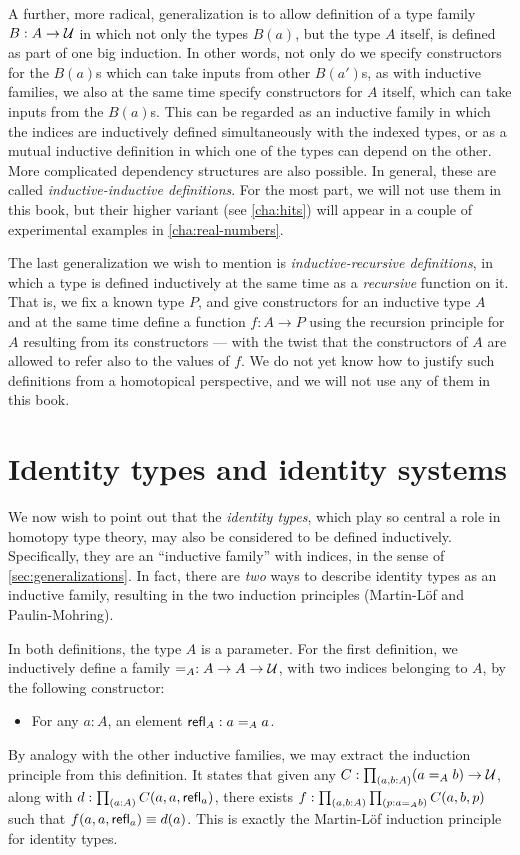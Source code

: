 A further, more radical, generalization is to allow definition of a type family $B:A\to \mathcal{U}$ in which not only the types $B(a)$, but the type $A$ itself, is defined as part of one big induction.
In other words, not only do we specify constructors for the $B(a)$s which can take inputs from other $B(a')$s, as with inductive families, we also at the same time specify constructors for $A$ itself, which can take inputs from the $B(a)$s.
This can be regarded as an inductive family in which the indices are inductively defined simultaneously with the indexed types, or as a mutual inductive definition in which one of the types can depend on the other.
More complicated dependency structures are also possible.
In general, these are called \emph{inductive-inductive definitions}.
For the most part, we will not use them in this book, but their higher variant (see \autoref{cha:hits}) will appear in a couple of experimental examples in \autoref{cha:real-numbers}.

The last generalization we wish to mention is \emph{inductive-recursive definitions}, in which a type is defined inductively at the same time as a \emph{recursive} function on it.
That is, we fix a known type $P$, and give constructors for an inductive type $A$ and at the same time define a function $f:A\to P$ using the recursion principle for $A$ resulting from its constructors --- with the twist that the constructors of $A$ are allowed to refer also to the values of $f$.
We do not yet know how to justify such definitions from a homotopical perspective, and we will not use any of them in this book.


\section{Identity types and identity systems}
\label{sec:identity-systems}

We now wish to point out that the \emph{identity types}, which play so central a role in homotopy type theory, may also be considered to be defined inductively.
Specifically, they are an ``inductive family'' with indices, in the sense of \autoref{sec:generalizations}.
In fact, there are \emph{two} ways to describe identity types as an inductive family, resulting in the two induction principles (Martin-L\"of and Paulin-Mohring).

In both definitions, the type $A$ is a parameter.
For the first definition, we inductively define a family $=_A : A\to A\to \mathcal{U}$, with two indices belonging to $A$, by the following constructor:
\begin{itemize}
\item For any $a:A$, an element $\mathsf{refl}_{A} : a=_A a$.
\end{itemize}
By analogy with the other inductive families, we may extract the induction principle from this definition.
It states that given any $C:\prd{a,b:A} (a=_A b) \to \type$, along with $d:\prd{a:A} C(a,a,\refl{a})$, there exists $f:\prd{a,b:A}{p:a=_A b} C(a,b,p)$ such that $f(a,a,\mathsf{refl}_{a})\equiv d(a)$.
This is exactly the Martin-L\"of induction principle for identity types.

